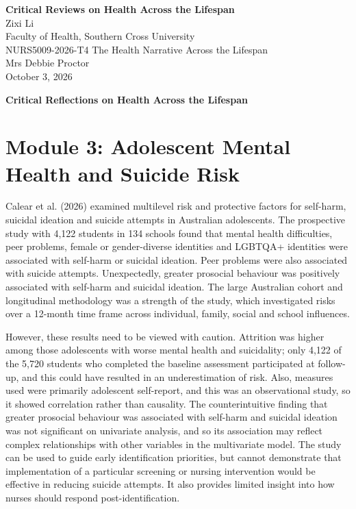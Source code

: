 \documentclass[12pt,a4paper]{article}
\begin{document}
\begin{titlepage}
\thispagestyle{plain}
\begin{center}
\vspace*{1.5in}
\textbf{Critical Reviews on Health Across the Lifespan}\\
\vspace{1.5em}
Zixi Li\\
Faculty of Health, Southern Cross University\\
NURS5009-2026-T4 The Health Narrative Across the Lifespan\\
Mrs Debbie Proctor\\
October 3, 2026
\end{center}
\end{titlepage}

\setcounter{page}{2}
\begin{center}
\textbf{Critical Reflections on Health Across the Lifespan}
\end{center}

\section*{Module 3: Adolescent Mental Health and Suicide Risk}

Calear et al. (2026) examined multilevel risk and protective factors for self-harm, suicidal ideation and suicide attempts in Australian adolescents. The prospective study with 4,122 students in 134 schools found that mental health difficulties, peer problems, female or gender-diverse identities and LGBTQA+ identities were associated with self-harm or suicidal ideation. Peer problems were also associated with suicide attempts. Unexpectedly, greater prosocial behaviour was positively associated with self-harm and suicidal ideation. The large Australian cohort and longitudinal methodology was a strength of the study, which investigated risks over a 12-month time frame across individual, family, social and school influences.

However, these results need to be viewed with caution. Attrition was higher among those adolescents with worse mental health and suicidality; only 4,122 of the 5,720 students who completed the baseline assessment participated at follow-up, and this could have resulted in an underestimation of risk. Also, measures used were primarily adolescent self-report, and this was an observational study, so it showed correlation rather than causality. The counterintuitive finding that greater prosocial behaviour was associated with self-harm and suicidal ideation was not significant on univariate analysis, and so its association may reflect complex relationships with other variables in the multivariate model. The study can be used to guide early identification priorities, but cannot demonstrate that implementation of a particular screening or nursing intervention would be effective in reducing suicide attempts. It also provides limited insight into how nurses should respond post-identification.
\end{document}

